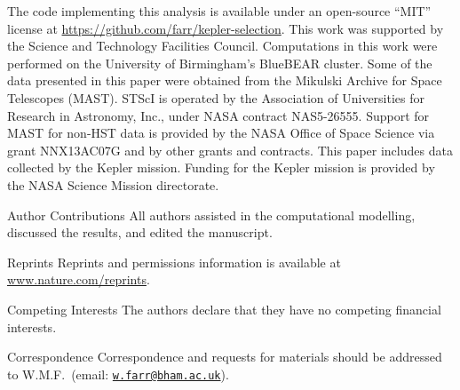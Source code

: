 \documentclass{nature}
\newcommand{\email}[1]{\href{mailto:#1}{\nolinkurl{#1}}}
\begin{document}


\begin{addendum}
\item The code implementing this analysis is available under an
  open-source ``MIT'' license at
  \url{https://github.com/farr/kepler-selection}.  This work was
  supported by the Science and Technology Facilities Council.
  Computations in this work were performed on the University of
  Birmingham's BlueBEAR cluster.  Some of the data presented in
  this paper were obtained from the Mikulski Archive for Space
  Telescopes (MAST). STScI is operated by the Association of
  Universities for Research in Astronomy, Inc., under NASA contract
  NAS5-26555. Support for MAST for non-HST data is provided by the
  NASA Office of Space Science via grant NNX13AC07G and by other
  grants and contracts.  This paper includes data collected by the
  Kepler mission. Funding for the Kepler mission is provided by the
  NASA Science Mission directorate.
\item [Author Contributions] All authors assisted in the computational
  modelling, discussed the results, and edited the manuscript.
\item [Reprints] Reprints and permissions information is available at
  \url{www.nature.com/reprints}.
\item[Competing Interests] The authors declare that they have no
  competing financial interests.
\item[Correspondence] Correspondence and requests for materials should
  be addressed to W.M.F.\ (email: \email{w.farr@bham.ac.uk}).
\end{addendum}
\end{document}

